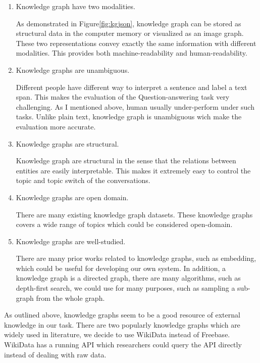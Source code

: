 \documentclass[bsc,frontabs,twoside,singlespacing,parskip,deptreport]{infthesis}     %
\begin{document}
\begin{enumerate}
   \item Knowledge graph have two modalities.
   
   As demonstrated in Figure\ref{fig:kgjson}, knowledge graph can be stored as structural data in the computer memory or visualized as an image graph. These two representations convey exactly the same information with different modalities. This provides both machine-readability and human-readability.
   
   \item Knowledge graphs are unambiguous.
   
   Different people have different way to interpret a sentence and label a text span. This makes the evaluation of the Question-answering task very challenging. As I mentioned above, human usually under-perform under such tasks. Unlike plain text, knowledge graph is unambiguous wich make the evaluation more accurate.
   
   \item  Knowledge graphs are structural.
   
   Knowledge graph are structural in the sense that the relations between entities are easily interpretable. This makes it extremely easy to control the topic and topic switch of the conversations.

    
    \item Knowledge graphs are open domain.
    
    There are many existing knowledge graph datasets\cite{vrandevcic2014wikidata,bollacker2008freebase}. These knowledge graphs covers a wide range of topics which could be considered open-domain.
    
    \item Knowledge graphs are well-studied.
    
    There are many prior works related to knowledge graphs, such as embedding\cite{lin2015learning}, which could be useful for developing our own system. In addition, a knowledge graph is a directed graph, there are many algorithms, such as depth-first search, we could use for many purposes, such as sampling a sub-graph from the whole graph.

\end{enumerate}

As outlined above, knowledge graphs seem to be a good resource of external knowledge in our task. There are two popularly knowledge graphs which are widely used in literature, we decide to use WikiData\cite{vrandevcic2014wikidata} instead of Freebase\cite{bollacker2008freebase}. WikiData has a running API which researchers could query the API directly instead of dealing with raw data.
\end{document}
